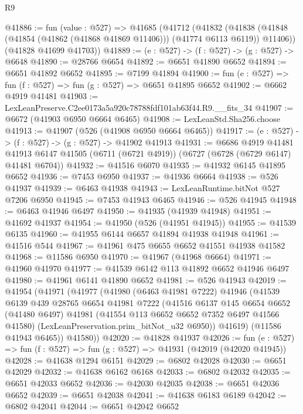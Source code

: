 \begin{lexlean}{R9}
\begin{coremodule}
@41886 := fun (value : @527) =>
  @41685
    (@41712
      (@41832
        (@41838 (@41848 (@41854 (@41862 (@41868 @41869 @11406))) (@41774 @6113 @6119)) @11406))
      (@41828 @41699 @41703))
@41889 := (e : @527) -> (f : @527) -> (g : @527) -> @6648
@41890 := @28766 @6654
@41892 := @6651 @41890 @6652
@41894 := @6651 @41892 @6652
@41895 := @7199 @41894
@41900 := fun (e : @527) => fun (f : @527) => fun (g : @527) => @6651 @41895 @6652
@41902 := @6662 @4919 @41481
@41903 := LexLeanPreserve.C2ee0173a5a920c78788fdf101ab63f44.R9.__fits_34
@41907 := @6672 (@41903 @6950 @6664 @6465)
@41908 := LexLeanStd.Sha256.choose
@41913 := @41907 (@526 (@41908 @6950 @6664 @6465))
@41917 := (e : @527) -> (f : @527) -> (g : @527) -> @41902 @41913
@41931 := @6686
    @4919
    @41481
    @41913
    @6147
    @41505
    (@6711 (@6721 @4919))
    (@6727 (@6728 (@6729 @6147) @41481 @6704))
@41932 := @41516 @6070
@41935 := @41932 @6145 @41895 @6652
@41936 := @7453 @6950
@41937 := @41936 @6664
@41938 := @526 @41937
@41939 := @6463 @41938
@41943 := LexLeanRuntime.bitNot @527 @7206 @6950
@41945 := @7453 @41943 @6465
@41946 := @526 @41945
@41948 := @6463 @41946 @6497
@41950 := @41935 (@41939 @41948)
@41951 := @41692 @41937
@41954 := @41950 (@526 (@41951 @41945))
@41955 := @41539 @6135
@41960 := @41955 @6144 @6657 @41894 @41938 @41948
@41961 := @41516 @544
@41967 := @41961 @475 @6655 @6652 @41551 @41938 @41582
@41968 := @11586 @6950
@41970 := @41967 (@41968 @6664)
@41971 := @41960 @41970
@41977 := @41539 @6142 @113 @41892 @6652 @41946 @6497
@41980 := @41961 @6141 @41890 @6652
@41981 := @526 @41943
@42019 := @41954
    (@41971
      (@41977
        (@41980
          (@6463 @41981 @7222)
          @41946
          (@41539
            @6139
            @439
            @28765
            @6654
            @41981
            @7222
            (@41516
              @6137
              @145
              @6654
              @6652
              (@41480 @6497)
              @41981
              (@41554 @113 @6652 @6652 @7352 @6497 @41566 @41580)
              (LexLeanPreservation.prim_bitNot_u32 @6950))
            @41619)
          (@11586 @41943 @6465))
        @41580))
@42020 := @41828 @41937
@42026 := fun (e : @527) => fun (f : @527) => fun (g : @527) => @41931 (@42019 (@42020 @41945))
@42028 := @41638 @1294 @6151
@42029 := @6802 @42028
@42030 := @6651 @42029
@42032 := @41638 @6162 @6168
@42033 := @6802 @42032
@42035 := @6651 @42033 @6652
@42036 := @42030 @42035
@42038 := @6651 @42036 @6652
@42039 := @6651 @42038
@42041 := @41638 @6183 @6189
@42042 := @6802 @42041
@42044 := @6651 @42042 @6652

\end{coremodule}
\end{lexlean}
